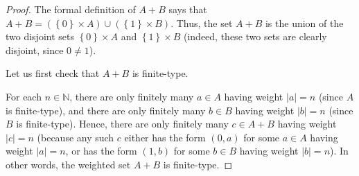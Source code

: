\begin{proof}
The formal definition of $A+B$ says that $A+B=\left(  \left\{  0\right\}
\times A\right)  \cup\left(  \left\{  1\right\}  \times B\right)  $. Thus, the
set $A+B$ is the union of the two disjoint sets $\left\{  0\right\}  \times A$
and $\left\{  1\right\}  \times B$ (indeed, these two sets are clearly
disjoint, since $0\neq1$).

Let us first check that $A+B$ is finite-type.

For each $n\in\mathbb{N}$, there are only finitely many $a\in A$ having weight
$\left\vert a\right\vert =n$ (since $A$ is finite-type), and there are only
finitely many $b\in B$ having weight $\left\vert b\right\vert =n$ (since $B$
is finite-type). Hence, there are only finitely many $c\in A+B$ having weight
$\left\vert c\right\vert =n$ (because any such $c$ either has the form
$\left(  0,a\right)  $ for some $a\in A$ having weight $\left\vert
a\right\vert =n$, or has the form $\left(  1,b\right)  $ for some $b\in B$
having weight $\left\vert b\right\vert =n$). In other words, the weighted set
$A+B$ is finite-type.


\end{proof}
